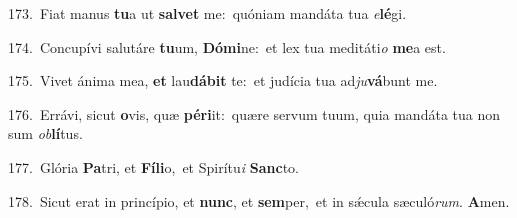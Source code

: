 {\numbfont\textcolor{\numbcolor}{173.}}~Fiat manus \textbf{tu}\-a ut \textbf{sal}\-\textbf{vet} me:~\star quóniam mandáta tua \textit{e}\-\textbf{lé}gi.\par
{\numbfont\textcolor{\numbcolor}{174.}}~Concupívi salutáre \textbf{tu}\-um, \textbf{Dó}\-\textbf{mi}ne:~\star et lex tua meditáti\textit{o} \textbf{me}\-a est.\par
{\numbfont\textcolor{\numbcolor}{175.}}~Vivet ánima mea, \textbf{et} lau\-\textbf{dá}\-\textbf{bit} te:~\star et judícia tua ad\-\textit{ju}\-\textbf{vá}bunt me.\par
{\numbfont\textcolor{\numbcolor}{176.}}~Errávi, sicut \textbf{o}\-vis, quæ \textbf{pér}\-\textbf{i}it:~\star quære servum tuum, quia mandáta tua non sum \textit{ob}\-\textbf{lí}tus.\par
{\numbfont\textcolor{\numbcolor}{177.}}~Glória \textbf{Pa}\-tri, et \textbf{Fí}\-\textbf{li}o,~\star et Spirítu\textit{i} \textbf{Sanc}\-to.\par
{\numbfont\textcolor{\numbcolor}{178.}}~Sicut erat in princípio, et \textbf{nunc}\-, et \textbf{sem}\-per,~\star et in sǽcula sæculó\-\textit{rum}\-. \textbf{A}\-men.\par
